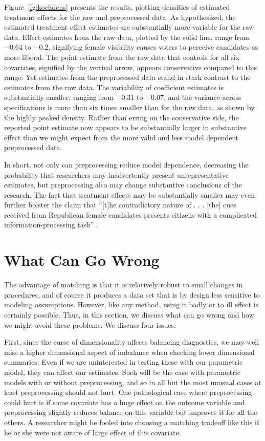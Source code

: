 \documentclass[11pt,titlepage]{article}
\begin{document}
Figure~\ref{fg:kochdens} presents the results, plotting densities of
estimated treatment effects for the raw and preprocessed data.  As
hypothesized, the estimated treatment effect estimates are
substantially more variable for the raw data.  Effect estimates from
the raw data, plotted by the solid line, range from $-0.64$ to $-0.2$,
signifying female visibility causes voters to perceive candidates as
more liberal.  The point estimate from the raw data that controls for
all six covariates, signified by the vertical arrow, appears
conservative compared to this range.  Yet estimates from the
preprocessed data stand in stark contrast to the estimates from the
raw data.  The variability of coefficient estimates is substantially
smaller, ranging from $-0.31$ to $-0.07$, and the variance across
specifications is more than six times smaller than for the raw data,
as shown by the highly peaked density.  Rather than erring on the
conservative side, the reported point estimate now appears to be
substantially larger in substantive effect than we might expect from
the more valid and less model dependent preprocessed data.

In short, not only can preprocessing reduce model dependence,
decreasing the probability that researchers may inadvertently present
unrepresentative estimates, but preprocessing also may change
substantive conclusions of the research.  The fact that treatment
effects may be substantially smaller may even further bolster the
claim that ``[t]he contradictory nature of . . . [the] cues received
from Republican female candidates presents citizens with a complicated
information-processing task'' \citep[p. 460]{Koch02}.

\section{What Can Go Wrong}

The advantage of matching is that it is relatively robust to small
changes in procedures, and of course it produces a data set that is by
design less sensitive to modeling assumptions.  However, like any
method, using it badly or to ill effect is certainly possible.  Thus,
in this section, we discuss what can go wrong and how we might avoid
these problems.  We discuss four issues.

First, since the curse of dimensionality affects balancing
diagnostics, we may well miss a higher dimensional aspect of imbalance
when checking lower dimensional summaries.  Even if we are
uninterested in testing these with our parametric model, they can
affect our estimates.  Such will be the case with parametric models
with or without preprocessing, and so in all but the most unusual
cases at least preprocessing should not hurt.  One pathological case
where preprocessing could hurt is if some covariate has a huge effect
on the outcome variable and preprocessing slightly reduces balance on
this variable but improves it for all the others.  A researcher might
be fooled into choosing a matching tradeoff like this if he or she
were not aware of large effect of this covariate.
\end{document}
